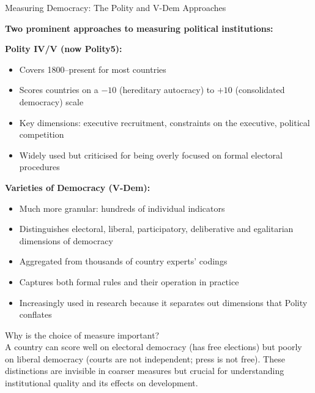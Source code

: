 \documentclass[10pt]{beamer}
\begin{document}
\begin{frame}[allowframebreaks]{Measuring Democracy: The Polity and V-Dem Approaches}

\textbf{Two prominent approaches to measuring political institutions:}


\textbf{Polity IV/V (now Polity5):}
\begin{itemize}
\item Covers 1800--present for most countries
\item Scores countries on a $-10$ (hereditary autocracy) to $+10$ (consolidated democracy) scale
\item Key dimensions: executive recruitment, constraints on the executive, political competition
\item Widely used but criticised for being overly focused on formal electoral procedures
\end{itemize}


\textbf{Varieties of Democracy (V-Dem):}
\begin{itemize}
\item Much more granular: hundreds of individual indicators
\item Distinguishes electoral, liberal, participatory, deliberative and egalitarian dimensions of democracy
\item Aggregated from thousands of country experts' codings
\item Captures both formal rules and their operation in practice
\item Increasingly used in research because it separates out dimensions that Polity conflates
\end{itemize}


\alert{Why is the choice of measure important?}\\
A country can score well on electoral democracy (has free elections) but poorly on liberal democracy (courts are not independent; press is not free). These distinctions are invisible in coarser measures but crucial for understanding institutional quality and its effects on development.
\end{frame}
\end{document}
